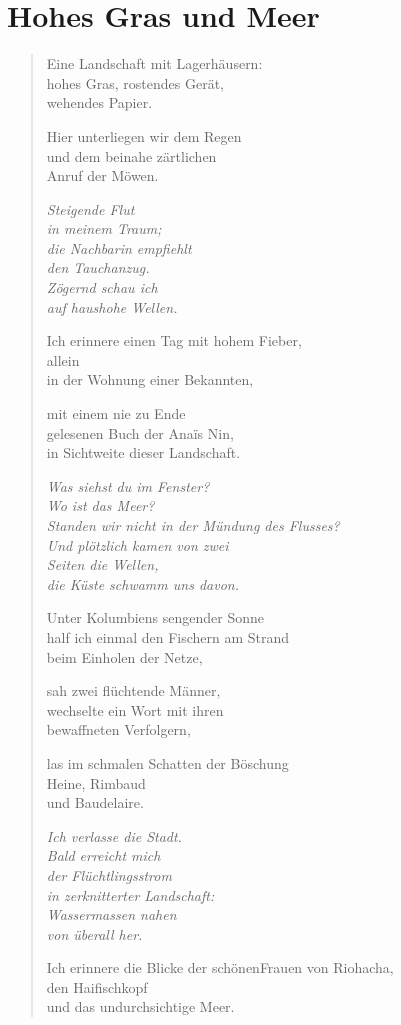 
\cleartoverso

\section{Hohes Gras und Meer}

\begin{verse}

Eine Landschaft mit Lagerhäusern:\\
hohes Gras, rostendes Gerät,\\
wehendes Papier.

Hier unterliegen wir dem Regen\\
und dem beinahe zärtlichen\\
Anruf der Möwen.

{\itshape
Steigende Flut\\
in meinem Traum;\\
die Nachbarin empfiehlt\\
den Tauchanzug.\\
Zögernd schau ich\\
auf haushohe Wellen.}

Ich erinnere einen Tag mit hohem Fieber,\\
allein\\
in der Wohnung einer Bekannten,

mit einem nie zu Ende\\
gelesenen Buch der Anaïs Nin,\\
in Sichtweite dieser Landschaft.

{\itshape
Was siehst du im Fenster?\\
Wo ist das Meer?\\
Standen wir nicht in der Mündung des Flusses?\\
Und plötzlich kamen von zwei\\
Seiten die Wellen,\\
die Küste schwamm uns davon.}

Unter Kolumbiens sengender Sonne\\
half ich einmal den Fischern am Strand\\
beim Einholen der Netze,

sah zwei flüchtende Männer,\\
wechselte ein Wort mit ihren\\
bewaffneten Verfolgern,

las im schmalen Schatten der Böschung\\
Heine, Rimbaud\\
und Baudelaire.

{\itshape
Ich verlasse die Stadt.\\
Bald erreicht mich\\
der Flüchtlingsstrom\\
in zerknitterter Landschaft:\\
Wassermassen nahen\\
von überall her.}

Ich erinnere die Blicke der schönen\verselinebreak Frauen von Riohacha,\\
den Haifischkopf\\
und das undurchsichtige Meer.

\end{verse}

